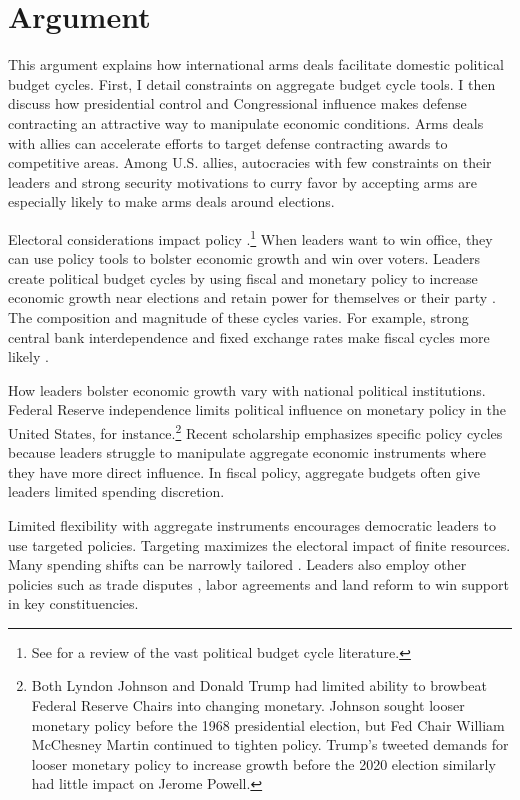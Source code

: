 \documentclass[12pt]{article}
\begin{document}
\section{Argument}


This argument explains how international arms deals facilitate domestic political budget cycles.
First, I detail constraints on aggregate budget cycle tools.
I then discuss how presidential control and Congressional influence makes defense contracting an attractive way to manipulate economic conditions. 
Arms deals with allies can accelerate efforts to target defense contracting awards to competitive areas. 
Among U.S. allies, autocracies with few constraints on their leaders and strong security motivations to curry favor by accepting arms are especially likely to make arms deals around elections.


Electoral considerations impact policy \citep{Nordhaus1975}.\footnote{See \citet{Dubois2016} for a review of the vast political budget cycle literature.} 
When leaders want to win office, they can use policy tools to bolster economic growth and win over voters. 
Leaders create political budget cycles by using fiscal and monetary policy to increase economic growth near elections and retain power for themselves or their party \citep{Tufte1978, Rogoff1987}. 
The composition and magnitude of these cycles varies. 
For example, strong central bank interdependence and fixed exchange rates make fiscal cycles more likely \citep{ClarkHallerberg2000}. 


How leaders bolster economic growth vary with national political institutions. 
Federal Reserve independence limits political influence on monetary policy in the United States, for instance.\footnote{Both Lyndon Johnson and Donald Trump had limited ability to browbeat Federal Reserve Chairs into changing monetary. 
Johnson sought looser monetary policy before the 1968 presidential election, but Fed Chair William McChesney Martin continued to tighten policy.
Trump's tweeted demands for looser monetary policy to increase growth before the 2020 election similarly had little impact on Jerome Powell.}
Recent scholarship emphasizes specific policy cycles because leaders struggle to manipulate aggregate economic instruments where they have more direct influence. 
In fiscal policy, aggregate budgets often give leaders limited spending discretion.


Limited flexibility with aggregate instruments encourages democratic leaders to use targeted policies.
Targeting maximizes the electoral impact of finite resources.
Many spending shifts can be narrowly tailored \citep[pg. 248]{Dubois2016}.
Leaders also employ other policies such as trade disputes \citep{Conconietal2017}, labor agreements \citep{Ahlquist2010} and land reform \citep{Philips2020} to win support in key constituencies.
\end{document}

